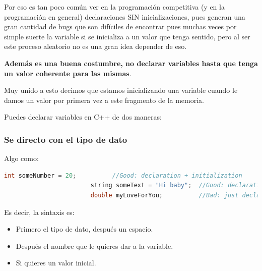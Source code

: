 \documentclass[12pt, fleqn]{report}                             %
\theoremstyle{break}                                            %
\begin{document}
                Por eso es tan poco común ver en la programación competitiva (y en la programación en general)
                declaraciones SIN inicializaciones,
                pues generan una gran cantidad de bugs que son difíciles de encontrar pues muchas veces
                por simple suerte la variable si se inicializa a un valor que tenga sentido, pero
                al ser este proceso aleatorio no es una gran idea depender de eso.

                \textbf{Además es una buena costumbre, no declarar variables hasta que tenga un valor coherente para
                las mismas}.

                \clearpage

                Muy unido a esto decimos que estamos inicializando una variable cuando le damos
                un valor por primera vez a este fragmento de la memoria.
                
                Puedes declarar variables en C++ de dos maneras:

                \subsubsection{Se directo con el tipo de dato}

                    Algo como:
                    \begin{lstlisting}[language=C++, gobble=24]
                        int someNumber = 20;          //Good: declaration + initialization
                        string someText = "Hi baby";  //Good: declaration + initialization
                        double myLoveForYou;          //Bad: just declaration
                    \end{lstlisting}

                    Es decir, la sintaxis es:
                    \begin{itemize}
                        \item Primero el tipo de dato, después un espacio.
                        \item Después el nombre que le quieres dar a la variable.
                        \item Si quieres un valor inicial.
                    \end{itemize} 
\end{document}
